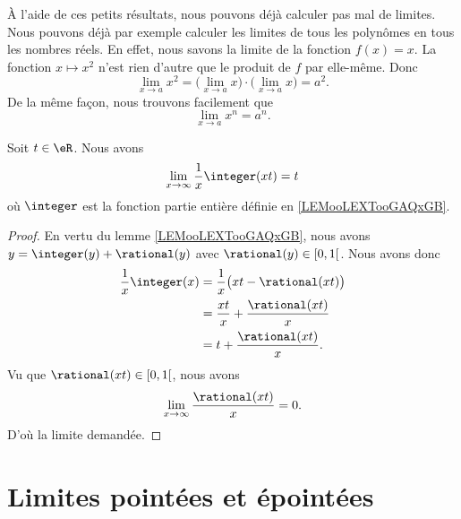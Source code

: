 À l'aide de ces petits résultats, nous pouvons déjà calculer pas mal de limites. Nous pouvons déjà par exemple calculer les limites de tous les polynômes en tous les nombres réels. En effet, nous savons la limite de la fonction $f(x)=x$. La fonction $x\mapsto x^2$ n'est rien d'autre que le produit de $f$ par elle-même. Donc
\[
	\lim_{x\to a}x^2=\big( \lim_{x\to a}x\big)\cdot\big( \lim_{x\to a}x \big)=a^2.
\]
De la même façon, nous trouvons facilement que
\begin{equation}
	\lim_{x\to a}x^n=a^n.
\end{equation}

\begin{lemma}       \label{LEMooLSJZooDauTkc}
	Soit \( t\in \eR\). Nous avons
	\begin{equation}
		\lim_{x\to \infty} \frac{1}{ x }\integer(xt)=t
	\end{equation}
	où \( \integer\) est la fonction partie entière définie en \ref{LEMooLEXTooGAQxGB}.
\end{lemma}

\begin{proof}
	En vertu du lemme \ref{LEMooLEXTooGAQxGB}, nous avons $y=\integer(y)+\rational(y)$ avec \( \rational(y)\in \mathopen[ 0 , 1 \mathclose[\). Nous avons donc
	\begin{subequations}
		\begin{align}
			\frac{1}{ x }\integer(x) & =\frac{1}{ x }\big( xt-\rational(xt) \big)    \\
			                         & =\frac{ xt }{ x }+\frac{ \rational(xt) }{ x } \\
			                         & =t+\frac{ \rational(xt) }{ x }.
		\end{align}
	\end{subequations}
	Vu que \( \rational(xt)\in \mathopen[ 0 , 1 \mathclose[\), nous avons
	\begin{equation}
		\lim_{x\to \infty} \frac{ \rational(xt) }{ x }=0.
	\end{equation}
	D'où la limite demandée.
\end{proof}

\section{Limites pointées et épointées}
\label{SECooNJSGooGSAtdV}

